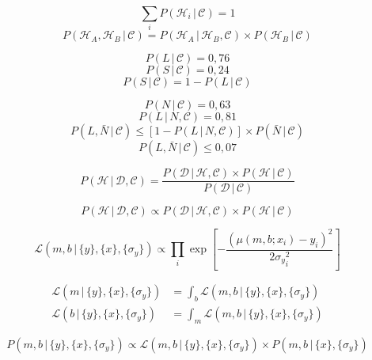 \documentclass[12pt]{article}
\begin{document}
$$\sum_i P(\mathcal{H}_i\,|\,\mathcal{C})=1$$
$$P(\mathcal{H}_A,\mathcal{H}_B\,|\,\mathcal{C})=P(\mathcal{H}_A\,|\,\mathcal{H}_B,\mathcal{C})\times P(\mathcal{H}_B\,|\,\mathcal{C})$$

$$P(L\,|\,\mathcal{C})=0,76$$
$$P(S\,|\,\mathcal{C})=0,24$$
$$P(S\,|\,\mathcal{C})=1-P(L\,|\,\mathcal{C})$$

$$P(N\,|\,\mathcal{C})=0,63$$
$$P(L\,|\,N,\mathcal{C})=0,81$$
$$P(L,\bar{N}\,|\,\mathcal{C})\leq \left[1-P(L\,|\,N,\mathcal{C})\right]\times P(\bar{N}\,|\,\mathcal{C})$$
$$P(L,\bar{N}\,|\,\mathcal{C})\leq 0,07$$

\newpage

$$P(\mathcal{H}\,|\,\mathcal{D},\mathcal{C})=\frac{P(\mathcal{D}\,|\,\mathcal{H},\mathcal{C})\times P(\mathcal{H}\,|\,\mathcal{C})}{P(\mathcal{D\,|\,\mathcal{C}})}$$

$$P(\mathcal{H}\,|\,\mathcal{D},\mathcal{C})\propto P(\mathcal{D}\,|\,\mathcal{H},\mathcal{C})\times P(\mathcal{H}\,|\,\mathcal{C})$$

\newpage

$$\mathcal{L}(m,b\,|\,\{y\},\{x\},\{\sigma_y\})\propto\prod_i\exp{\left[-\frac{(\mu(m,b;x_i)-y_i)^2}{2{\sigma_y}_i^2}\right]}$$

\begin{align*}\mathcal{L}(m\,|\,\{y\},\{x\},\{\sigma_y\}) &= \int_b \mathcal{L}(m,b\,|\,\{y\},\{x\},\{\sigma_y\}) \\\mathcal{L}(b\,|\,\{y\},\{x\},\{\sigma_y\}) &= \int_m \mathcal{L}(m,b\,|\,\{y\},\{x\},\{\sigma_y\})\end{align*}

$$P(m,b\,|\,\{y\},\{x\},\{\sigma_y\})\propto \mathcal{L}(m,b\,|\,\{y\},\{x\},\{\sigma_y\})\times P(m,b\,|\,\{x\},\{\sigma_y\})$$
\end{document}
